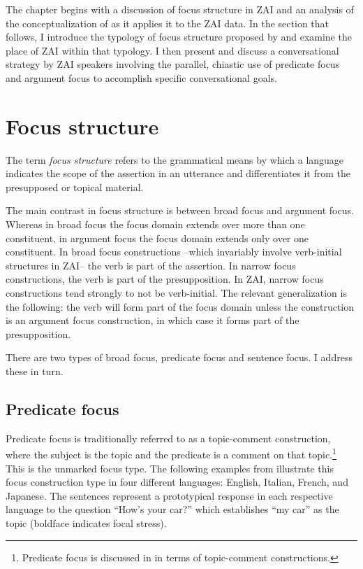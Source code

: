 The chapter begins with a discussion of focus structure in ZAI and an analysis of the conceptualization of \citet{lambrecht1994} as it applies it to the ZAI data. In the section that follows, I introduce the typology of focus structure proposed by \citet{vanvalin1999} and examine the place of ZAI within that typology. I then present and discuss a conversational strategy by ZAI speakers involving the parallel, chiastic use of predicate focus and argument focus to accomplish specific conversational goals. 


\section{Focus structure}

The term \textit{focus structure} \citep{lambrecht1994} refers to the grammatical means by which a language indicates the scope of the assertion in an utterance and differentiates it from the presupposed or topical material.

The main contrast in focus structure is between broad focus and argument focus. Whereas in broad focus the focus domain extends over more than one constituent, in argument focus the focus domain extends only over one constituent. In broad focus constructions --which invariably involve verb-initial structures in ZAI-- the verb is part of the assertion. In narrow focus constructions, the verb is part of the presupposition. In ZAI,  narrow focus constructions tend strongly to not be verb-initial. The relevant generalization is the following: the verb will form part of the focus domain unless the construction is an argument focus construction, in which case it forms part of the presupposition.  

There are two types of broad focus, predicate focus and sentence focus. I address these in turn.


\subsection{Predicate focus}\label{pfsection}

Predicate focus is traditionally referred to as a topic-comment construction, where the subject is the topic and the predicate is a comment on that topic.\footnote{Predicate focus is discussed in  in terms of topic-comment constructions.} This is the unmarked focus type. The following examples from \citet{lambrecht1994} illustrate this focus construction type in four different languages: English, Italian, French, and Japanese. The sentences represent a prototypical response in each respective language to the question ``How's your car?'' which establishes ``my car'' as the topic (boldface indicates focal stress). 


